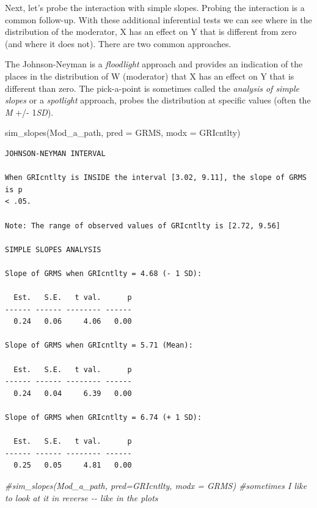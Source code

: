 \documentclass[
]{book}
\newenvironment{Shaded}{\begin{snugshade}}{\end{snugshade}}
\newcommand{\AttributeTok}[1]{\textcolor[rgb]{0.77,0.63,0.00}{#1}}
\newcommand{\CommentTok}[1]{\textcolor[rgb]{0.56,0.35,0.01}{\textit{#1}}}
\newcommand{\FunctionTok}[1]{\textcolor[rgb]{0.00,0.00,0.00}{#1}}
\newcommand{\NormalTok}[1]{#1}
\begin{document}
Next, let's probe the interaction with simple slopes. Probing the interaction is a common follow-up. With these additional inferential tests we can see where in the distribution of the moderator, X has an effect on Y that is different from zero (and where it does not). There are two common approaches.

The Johnson-Neyman is a \emph{floodlight} approach and provides an indication of the places in the distribution of W (moderator) that X has an effect on Y that is different than zero. The pick-a-point is sometimes called the \emph{analysis of simple slopes} or a \emph{spotlight} approach, probes the distribution at specific values (often the \emph{M} +/- 1\emph{SD}).

\begin{Shaded}
\begin{Highlighting}[]
\FunctionTok{sim\_slopes}\NormalTok{(Mod\_a\_path, }\AttributeTok{pred =}\NormalTok{ GRMS, }\AttributeTok{modx =}\NormalTok{ GRIcntlty)}
\end{Highlighting}
\end{Shaded}

\begin{verbatim}
JOHNSON-NEYMAN INTERVAL 

When GRIcntlty is INSIDE the interval [3.02, 9.11], the slope of GRMS is p
< .05.

Note: The range of observed values of GRIcntlty is [2.72, 9.56]

SIMPLE SLOPES ANALYSIS 

Slope of GRMS when GRIcntlty = 4.68 (- 1 SD): 

  Est.   S.E.   t val.      p
------ ------ -------- ------
  0.24   0.06     4.06   0.00

Slope of GRMS when GRIcntlty = 5.71 (Mean): 

  Est.   S.E.   t val.      p
------ ------ -------- ------
  0.24   0.04     6.39   0.00

Slope of GRMS when GRIcntlty = 6.74 (+ 1 SD): 

  Est.   S.E.   t val.      p
------ ------ -------- ------
  0.25   0.05     4.81   0.00
\end{verbatim}

\begin{Shaded}
\begin{Highlighting}[]
\CommentTok{\#sim\_slopes(Mod\_a\_path, pred=GRIcntlty, modx = GRMS) \#sometimes I like to look at it in reverse {-}{-} like in the plots}
\end{Highlighting}
\end{Shaded}
\end{document}

